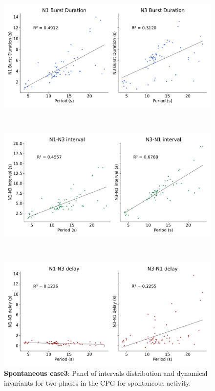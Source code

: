 \begin{figure}[htbp]
\begin{minipage}[b]{0.53\textwidth}
		\begin{minipage}[b]{\textwidth}
			\centering
			\includegraphics[width=\textwidth]{./invariants/data/SUSSEX/prep3/images/prep3_durations.pdf}
		\end{minipage}\\
		\begin{minipage}[b]{\textwidth}
			\centering
			\includegraphics[width=\textwidth]{./invariants/data/SUSSEX/prep3/images/prep3_intervals.pdf}
		\end{minipage}\\
		\begin{minipage}[b]{\textwidth}
			\centering
			\includegraphics[width=\textwidth]{./invariants/data/SUSSEX/prep3/images/prep3_delays.pdf}
		\end{minipage}
	\end{minipage}
	\caption{\textbf{Spontaneous case3}: Panel of intervals distribution and dynamical invariants for two phases in the CPG for spontaneous activity.}
	\label{fig:prep3 2phases invariants}
\end{figure}

